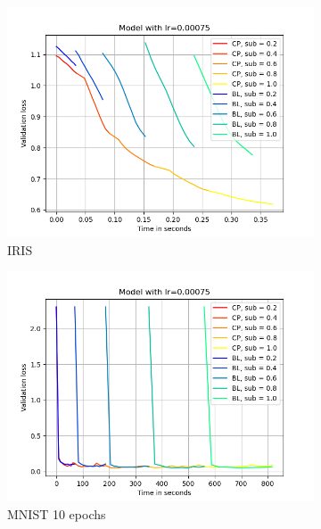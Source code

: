 \begin{figure}[h]
    \centering
    \begin{subfigure}[b]{0.24\textwidth}
        \centering
        \includegraphics[width=\textwidth]{figures/22_07/iris/loss_time_0.00075.png}
        \caption{IRIS}
        \label{fig:3a}
    \end{subfigure}
    \begin{subfigure}[b]{0.24\textwidth}
        \centering
        \includegraphics[width=\textwidth]{figures/22_07/10ep/loss_time_0.00075.png}
        \caption{MNIST 10 epochs}
        \label{fig:3b}
    \end{subfigure}
    \begin{subfigure}[b]{0.24\textwidth}

\end{subfigure}
\end{figure}
